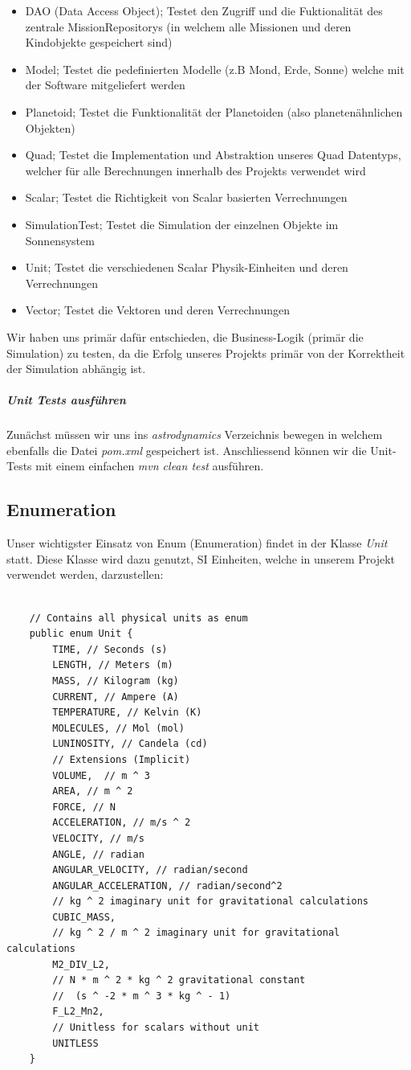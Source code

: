 \begin{itemize}
	\item DAO (Data Access Object); Testet den Zugriff und die Fuktionalität des zentrale MissionRepositorys (in welchem alle Missionen und deren Kindobjekte gespeichert sind)
	\item Model; Testet die pedefinierten Modelle (z.B Mond, Erde, Sonne) welche mit der Software mitgeliefert werden
	\item Planetoid; Testet die Funktionalität der Planetoiden (also planetenähnlichen Objekten)
	\item Quad; Testet die Implementation und Abstraktion unseres Quad Datentyps, welcher für alle Berechnungen innerhalb des Projekts verwendet wird
	\item Scalar; Testet die Richtigkeit von Scalar basierten Verrechnungen
	\item SimulationTest; Testet die Simulation der einzelnen Objekte im Sonnensystem
	\item Unit; Testet die verschiedenen Scalar Physik-Einheiten und deren Verrechnungen
	\item Vector; Testet die Vektoren und deren Verrechnungen
\end{itemize}

Wir haben uns primär dafür entschieden, die Business-Logik (primär die Simulation) zu testen, da die Erfolg unseres Projekts primär von der Korrektheit der Simulation abhängig ist.

\subparagraph{Unit Tests ausführen}

Zunächst müssen wir uns ins \textit{astrodynamics} Verzeichnis bewegen in welchem ebenfalls die Datei \textit{pom.xml} gespeichert ist.
Anschliessend können wir die Unit-Tests mit einem einfachen \textit{mvn clean test} ausführen.

\subsection{Enumeration}

Unser wichtigster Einsatz von Enum (Enumeration) findet in der Klasse \textit{Unit} statt. Diese Klasse wird dazu genutzt, SI Einheiten, welche in unserem Projekt verwendet werden, darzustellen:

\begin{lstlisting}
	
	// Contains all physical units as enum
	public enum Unit {
		TIME, // Seconds (s)
		LENGTH, // Meters (m)
		MASS, // Kilogram (kg)
		CURRENT, // Ampere (A)
		TEMPERATURE, // Kelvin (K)
		MOLECULES, // Mol (mol)
		LUNINOSITY, // Candela (cd)
		// Extensions (Implicit)
		VOLUME,  // m ^ 3
		AREA, // m ^ 2
		FORCE, // N
		ACCELERATION, // m/s ^ 2
		VELOCITY, // m/s
		ANGLE, // radian
		ANGULAR_VELOCITY, // radian/second
		ANGULAR_ACCELERATION, // radian/second^2
		// kg ^ 2 imaginary unit for gravitational calculations
		CUBIC_MASS, 
		// kg ^ 2 / m ^ 2 imaginary unit for gravitational calculations
		M2_DIV_L2,
		// N * m ^ 2 * kg ^ 2 gravitational constant
		//  (s ^ -2 * m ^ 3 * kg ^ - 1) 
		F_L2_Mn2,
		// Unitless for scalars without unit
		UNITLESS
	}

\end{lstlisting}

